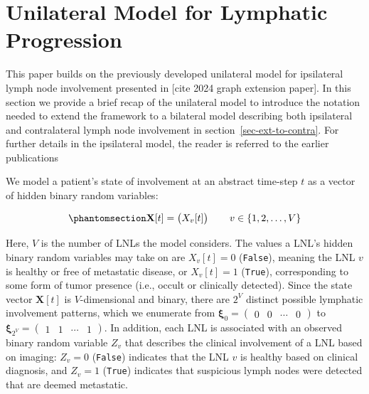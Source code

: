 \documentclass[
  sn-mathphys-num,
]{sn-jnl}
\begin{document}
\section{Unilateral Model for Lymphatic
Progression}\label{sec-unilateral}

This paper builds on the previously developed unilateral model for
ipsilateral lymph node involvement presented in {[}cite 2024 graph
extension paper{]}. In this section we provide a brief recap of the
unilateral model to introduce the notation needed to extend the
framework to a bilateral model describing both ipsilateral and
contralateral lymph node involvement in section~\ref{sec-ext-to-contra}.
For further details in the ipsilateral model, the reader is referred to
the earlier publications \citep[cite 2024 graph extension
paper]{ludwig_hidden_2021}

We model a patient's state of involvement at an abstract time-step \(t\)
as a vector of hidden binary random variables:

\begin{equation}\phantomsection\label{eq-state-def}{
\mathbf{X}[t] = \begin{pmatrix} X_v[t] \end{pmatrix} \qquad v \in \left\{ 1, 2, \ldots, V \right\}
}\end{equation}

Here, \(V\) is the number of LNLs the model considers. The values a
LNL's hidden binary random variables may take on are \(X_v[t] = 0\)
(\texttt{False}), meaning the LNL \(v\) is healthy or free of metastatic
disease, or \(X_v[t] = 1\) (\texttt{True}), corresponding to some form
of tumor presence (i.e., occult or clinically detected). Since the state
vector \(\mathbf{X}[t]\) is \(V\)-dimensional and binary, there are
\(2^V\) distinct possible lymphatic involvement patterns, which we
enumerate from
\(\boldsymbol{\xi}_0 = \begin{pmatrix} 0 & 0 & \cdots & 0 \end{pmatrix}\)
to
\(\boldsymbol{\xi}_{2^V} = \begin{pmatrix} 1 & 1 & \cdots & 1 \end{pmatrix}\).
In addition, each LNL is associated with an observed binary random
variable \(Z_v\) that describes the clinical involvement of a LNL based
on imaging: \(Z_v = 0\) (\texttt{False}) indicates that the LNL \(v\) is
healthy based on clinical diagnosis, and \(Z_v = 1\) (\texttt{True})
indicates that suspicious lymph nodes were detected that are deemed
metastatic.
\end{document}
